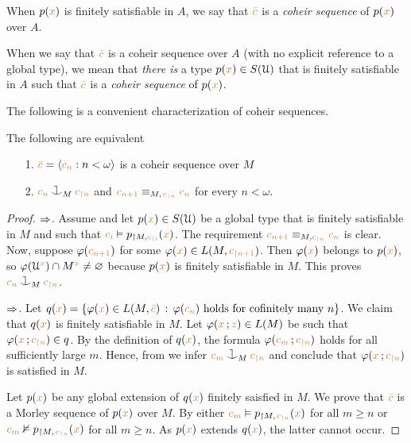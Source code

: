 When $p({\color{brown} x})$ is finitely satisfiable in $A$, we say that ${\color{brown}\bar c}$ is a \emph{coheir sequence\/} of $p({\color{brown} x})$ over $A$.

When we say that ${\color{brown}\bar c}$ is a coheir sequence over $A$ (with no explicit reference to a global type), we mean that \textit{there is\/} a type $p({\color{brown} x})\in S(\EuScript U)$ that is finitely satisfiable in $A$ such that ${\color{brown}\bar c}$ is a \emph{coheir sequence\/} of $p({\color{brown} x})$.

The following is a convenient characterization of coheir sequences.

\begin{lemma}\label{lem_coheir_property}
The following are equivalent
\begin{itemize}
\item[1.] ${\color{brown}\bar c}=\langle{\color{brown}c_n}:n<\omega\rangle$ is a coheir sequence over $M$
\item[2.] ${\mr c_n}\cnonfork_M{\mr c_{\restriction n}}$ and ${\color{brown} c_{n+1}}\equiv_{M,\,{\color{brown} c_{\restriction n}}}{\color{brown} c_n}$ for every $n<\omega$.
\end{itemize}
\end{lemma}

\begin{proof}
$\Rightarrow$.
Assume  and let $p({\color{brown} x})\in S(\EuScript U)$ be a global type that is finitely satisfiable in $M$ and such that ${\color{brown} c_i}\vDash p_{\restriction M,{\color{brown} c_{\restriction i}}}({\color{brown} x})$.
The requirement ${\color{brown} c_{n+1}}\equiv_{M,{\color{brown} c_{\restriction n}}} {\color{brown} c_n}$ is clear.
Now, suppose $\varphi({\color{brown} c_{n+1}})$ for some $\varphi({\color{brown} x})\in L(M,{\color{brown} c_{\restriction n+1}})$.
Then $\varphi({\color{brown} x})$ belongs to $p({\color{brown} x})$, so $\varphi(\EuScript U^{\color{brown} x})\cap M^{\color{brown} x}\neq\varnothing$ because $p({\color{brown} x})$ is finitely satisfiable in $M$.
This proves ${\mr c_n}\cnonfork_M{\mr c_{\restriction n}}$.

$\Rightarrow$.
Let $q({\color{brown} x})=\{\varphi({\color{brown} x})\in L(M, {\color{brown}\bar c})\,:\, \varphi({\color{brown} c_n}) \textrm{ holds for cofinitely many } n\}$.
%
We claim that $q({\color{brown} x})$ is finitely satisfiable in $M$.
%
Let $\varphi({\color{brown} x}\,;{\color{brown} z})\in L(M)$ be such that $\varphi({\color{brown} x}\,;{\color{brown} c_{\restriction n}})\in q$.
%
By the definition of $q({\color{brown} x})$, the formula $\varphi({\color{brown} c_m}\,;{\color{brown} c_{\restriction n}})$ holds for all sufficiently large $m$.
%
Hence, from  we infer ${\mr c_m}\cnonfork_M{\mr c_{\restriction n}}$ and conclude that $\varphi({\color{brown} x}\,;{\color{brown} c_{\restriction n}})$ is satisfied in $M$.

Let $p({\color{brown} x})$ be any global extension of $q({\color{brown} x})$ finitely saisfied in $M$.
%
We prove that ${\color{brown}\bar c}$ is a Morley sequence of $p({\color{brown} x})$ over $M$.
%
By  either ${\color{brown} c_m}\vDash p_{\restriction  M,\,{\color{brown} c_{\restriction n}}}({\color{brown} x})$ for all $m\ge n$ or ${\color{brown} c_m}\nvDash p_{\restriction  M,\,{\color{brown} c_{\restriction n}}}({\color{brown} x})$ for all $m\ge n$.
%
As $p({\color{brown} x})$ extends $q({\color{brown} x})$, the latter cannot occur.
\end{proof}

